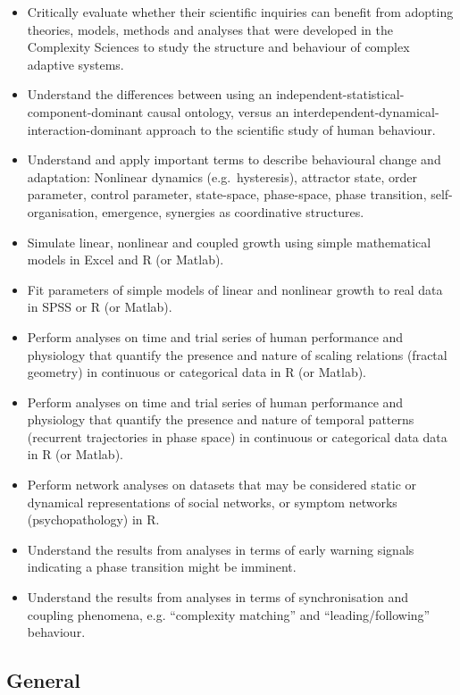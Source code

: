 \documentclass[12pt,]{book}
\providecommand{\tightlist}{%
  \setlength{\itemsep}{0pt}\setlength{\parskip}{0pt}}
\begin{document}
\begin{itemize}
\tightlist
\item
  Critically evaluate whether their scientific inquiries can benefit from adopting theories, models, methods and analyses that were developed in the Complexity Sciences to study the structure and behaviour of complex adaptive systems.
\item
  Understand the differences between using an independent-statistical-component-dominant causal ontology, versus an interdependent-dynamical-interaction-dominant approach to the scientific study of human behaviour.
\item
  Understand and apply important terms to describe behavioural change and adaptation: Nonlinear dynamics (e.g.~hysteresis), attractor state, order parameter, control parameter, state-space, phase-space, phase transition, self-organisation, emergence, synergies as coordinative structures.
\item
  Simulate linear, nonlinear and coupled growth using simple mathematical models in Excel and R (or Matlab).
\item
  Fit parameters of simple models of linear and nonlinear growth to real data in SPSS or R (or Matlab).
\item
  Perform analyses on time and trial series of human performance and physiology that quantify the presence and nature of scaling relations (fractal geometry) in continuous or categorical data in R (or Matlab).
\item
  Perform analyses on time and trial series of human performance and physiology that quantify the presence and nature of temporal patterns (recurrent trajectories in phase space) in continuous or categorical data data in R (or Matlab).
\item
  Perform network analyses on datasets that may be considered static or dynamical representations of social networks, or symptom networks (psychopathology) in R.
\item
  Understand the results from analyses in terms of early warning signals indicating a phase transition might be imminent.
\item
  Understand the results from analyses in terms of synchronisation and coupling phenomena, e.g. ``complexity matching'' and ``leading/following'' behaviour.
\end{itemize}

\hypertarget{general}{%
\subsection*{General}\label{general}}
\end{document}
